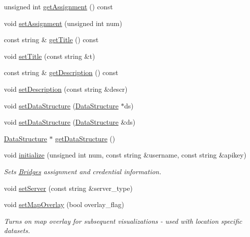 \begin{DoxyCompactItemize}
unsigned int \mbox{\hyperlink{classbridges_1_1_bridges_aa45b4ba781b5cbecc8cb04c76dfd527a}{get\+Assignment}} () const
\item 
void \mbox{\hyperlink{classbridges_1_1_bridges_aca7a68fb8cc0d1bec81656dfa77b1162}{set\+Assignment}} (unsigned int num)
\item 
const string \& \mbox{\hyperlink{classbridges_1_1_bridges_a8fe8c79b0f852c0049a699c801e40a61}{get\+Title}} () const
\item 
void \mbox{\hyperlink{classbridges_1_1_bridges_ac9f2e0b5fd5c70053db233dcbb636b56}{set\+Title}} (const string \&t)
\item 
const string \& \mbox{\hyperlink{classbridges_1_1_bridges_ae9f238e1d9fc421c6c08aacb74e0ef6c}{get\+Description}} () const
\item 
void \mbox{\hyperlink{classbridges_1_1_bridges_aa26285a4d04c2759113dcf233406a8da}{set\+Description}} (const string \&descr)
\item 
void \mbox{\hyperlink{classbridges_1_1_bridges_a7447e2d5808c492d26132690c1a639a7}{set\+Data\+Structure}} (\mbox{\hyperlink{classbridges_1_1datastructure_1_1_data_structure}{Data\+Structure}} $\ast$ds)
\item 
void \mbox{\hyperlink{classbridges_1_1_bridges_a40c30470565f76310b5a8aea80dcab3c}{set\+Data\+Structure}} (\mbox{\hyperlink{classbridges_1_1datastructure_1_1_data_structure}{Data\+Structure}} \&ds)
\item 
\mbox{\hyperlink{classbridges_1_1datastructure_1_1_data_structure}{Data\+Structure}} $\ast$ \mbox{\hyperlink{classbridges_1_1_bridges_a5ddfb17c2fb2d3ca89e7564677251dea}{get\+Data\+Structure}} ()
\item 
void \mbox{\hyperlink{classbridges_1_1_bridges_a507ee9983331d23829cfc60fd13ead78}{initialize}} (unsigned int num, const string \&username, const string \&apikey)
\begin{DoxyCompactList}\small\item\em Sets \mbox{\hyperlink{classbridges_1_1_bridges}{Bridges}} assignment and credential information. \end{DoxyCompactList}\item 
void \mbox{\hyperlink{classbridges_1_1_bridges_afa05302cf91c91b902aef693525107a5}{set\+Server}} (const string \&server\+\_\+type)
\item 
void \mbox{\hyperlink{classbridges_1_1_bridges_a221442c674b625a403486076cf8a7c03}{set\+Map\+Overlay}} (bool overlay\+\_\+flag)
\begin{DoxyCompactList}\small\item\em Turns on map overlay for subsequent visualizations -\/ used with location specific datasets. \end{DoxyCompactList}\item 

\end{DoxyCompactItemize}
